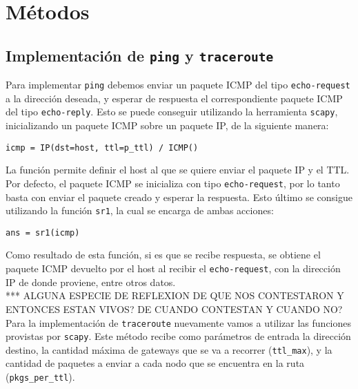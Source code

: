\section{M\'etodos}
 
 \subsection{Implementaci\'on de \texttt{ping} y \texttt{traceroute}}
 
 Para implementar \texttt{ping} debemos enviar un paquete ICMP del tipo \texttt{echo-request} a la direcci\'on deseada, y esperar de respuesta el correspondiente paquete ICMP del tipo \texttt{echo-reply}. Esto se puede conseguir utilizando la herramienta \texttt{scapy}, inicializando un paquete ICMP sobre un paquete IP, de la siguiente manera:\\
 
 \begin{center}
    \texttt{icmp = IP(dst=host, ttl=p\_ttl) / ICMP()}
 \end{center}
 
 La funci\'on permite definir el host al que se quiere enviar el paquete IP y el TTL. Por defecto, el paquete ICMP se inicializa con tipo \texttt{echo-request}, por lo tanto basta con enviar el paquete creado y esperar la respuesta. Esto \'ultimo se consigue utilizando la funci\'on \texttt{sr1}, la cual se encarga de ambas acciones:
 
 \begin{center}
    \texttt{ans = sr1(icmp)}
 \end{center}
 
 Como resultado de esta funci\'on, si es que se recibe respuesta, se obtiene el paquete ICMP devuelto por el host al recibir el \texttt{echo-request}, con la direcci\'on IP de donde proviene, entre otros datos.\\
 *** ALGUNA ESPECIE DE REFLEXION DE QUE NOS CONTESTARON Y ENTONCES ESTAN VIVOS? DE CUANDO CONTESTAN Y CUANDO NO?\\
 
 Para la implementaci\'on de \texttt{traceroute} nuevamente vamos a utilizar las funciones provistas por \texttt{scapy}. Este m\'etodo recibe como par\'ametros de entrada la direcci\'on destino, la cantidad m\'axima de gateways que se va a recorrer (\texttt{ttl\_max}), y la cantidad de paquetes a enviar a cada nodo que se encuentra en la ruta (\texttt{pkgs\_per\_ttl}).\\
 
